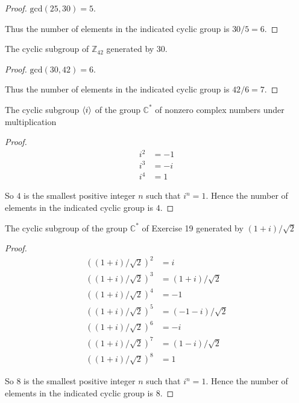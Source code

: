 \begin{proof}
    $\text{gcd}(25, 30) = 5$.

    Thus the number of elements in the indicated cyclic group is $30/5 = 6$.
\end{proof}

\newpage
\begin{exercise}
    The cyclic subgroup of $\mathbb{Z}_{42}$ generated by $30$.
\end{exercise}

\begin{proof}
    $\text{gcd}(30, 42) = 6$.

    Thus the number of elements in the indicated cyclic group is $42/6 = 7$.
\end{proof}

\newpage
\begin{exercise}
    The cyclic subgroup $\left\langle{i}\right\rangle$ of the group $\mathbb{C}^{*}$ of nonzero complex numbers under multiplication
\end{exercise}

\begin{proof}
    \begin{align*}
        i^{2} & = -1 \\
        i^{3} & = -i \\
        i^{4} & = 1
    \end{align*}

    So $4$ is the smallest positive integer $n$ such that $i^{n} = 1$. Hence the number of elements in the indicated cyclic group is $4$.
\end{proof}

\newpage
\begin{exercise}
    The cyclic subgroup of the group $\mathbb{C}^{*}$ of Exercise 19 generated by $(1 + i)/\sqrt{2}$
\end{exercise}

\begin{proof}
    \begin{align*}
        {((1 + i)/\sqrt{2})}^{2} & = i                   \\
        {((1 + i)/\sqrt{2})}^{3} & = {(1 + i)/\sqrt{2}}  \\
        {((1 + i)/\sqrt{2})}^{4} & = -1                  \\
        {((1 + i)/\sqrt{2})}^{5} & = {(-1 - i)/\sqrt{2}} \\
        {((1 + i)/\sqrt{2})}^{6} & = -i                  \\
        {((1 + i)/\sqrt{2})}^{7} & = {(1 - i)/\sqrt{2}}  \\
        {((1 + i)/\sqrt{2})}^{8} & = 1
    \end{align*}

    So $8$ is the smallest positive integer $n$ such that $i^{n} = 1$. Hence the number of elements in the indicated cyclic group is $8$.
\end{proof}

